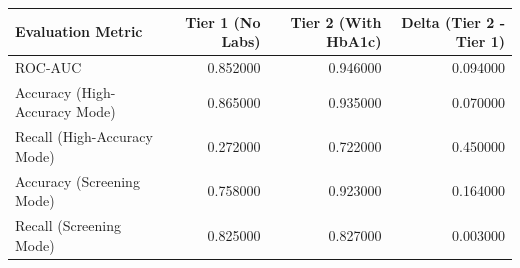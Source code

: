 \begin{tabular}{lrrr}
\toprule
Evaluation Metric & Tier 1 (No Labs) & Tier 2 (With HbA1c) & Delta (Tier 2 - Tier 1) \\
\midrule
ROC-AUC & 0.852000 & 0.946000 & 0.094000 \\
Accuracy (High-Accuracy Mode) & 0.865000 & 0.935000 & 0.070000 \\
Recall (High-Accuracy Mode) & 0.272000 & 0.722000 & 0.450000 \\
Accuracy (Screening Mode) & 0.758000 & 0.923000 & 0.164000 \\
Recall (Screening Mode) & 0.825000 & 0.827000 & 0.003000 \\
\bottomrule
\end{tabular}
